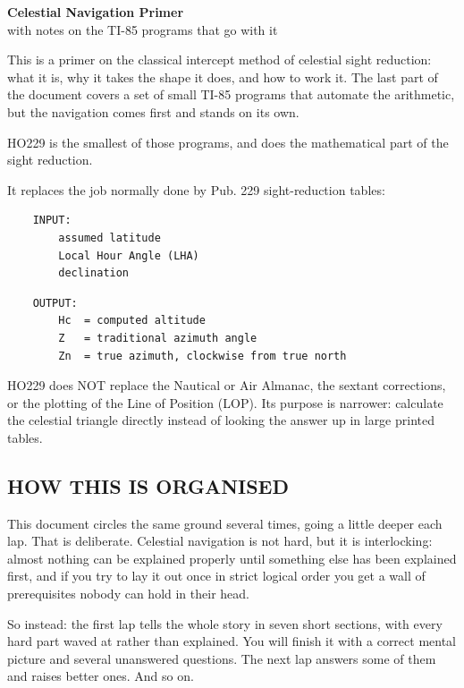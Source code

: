\documentclass[11pt]{article}
\begin{document}
\begin{center}
{\LARGE\bfseries Celestial Navigation Primer}\\[0.6ex]
{\normalsize with notes on the TI-85 programs that go with it}
\end{center}
\vspace{1.5ex}
This is a primer on the classical intercept method of celestial sight reduction: what it is, why it takes the shape it does, and how to work it. The last part of the document covers a set of small TI-85 programs that automate the arithmetic, but the navigation comes first and stands on its own.

HO229 is the smallest of those programs, and does the mathematical part of the sight reduction.

It replaces the job normally done by Pub. 229 sight-reduction tables:

\begin{verbatim}
    INPUT:
        assumed latitude
        Local Hour Angle (LHA)
        declination
\end{verbatim}

\begin{verbatim}
    OUTPUT:
        Hc  = computed altitude
        Z   = traditional azimuth angle
        Zn  = true azimuth, clockwise from true north
\end{verbatim}

HO229 does NOT replace the Nautical or Air Almanac, the sextant corrections, or the plotting of the Line of Position (LOP). Its purpose is narrower: calculate the celestial triangle directly instead of looking the answer up in large printed tables.

\subsection*{HOW THIS IS ORGANISED}

This document circles the same ground several times, going a little deeper each lap. That is deliberate. Celestial navigation is not hard, but it is interlocking: almost nothing can be explained properly until something else has been explained first, and if you try to lay it out once in strict logical order you get a wall of prerequisites nobody can hold in their head.

So instead: the first lap tells the whole story in seven short sections, with every hard part waved at rather than explained. You will finish it with a correct mental picture and several unanswered questions. The next lap answers some of them and raises better ones. And so on.
\end{document}

